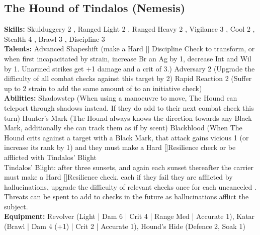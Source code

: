 \documentclass{article}
\newcommand\Hard{Hard [\Purple[3]]}
\begin{document}
\begin{multicols}{2}
{\subsection{The Hound of Tindalos (Nemesis)}
\begin{center}
\end{center}
\textbf{Skills:}
Skulduggery 2 \Yellow[2]\Green[2],
Ranged Light 2 \Yellow[2]\Green[3],
Ranged Heavy 2 \Yellow[2]\Green[3],
Vigilance 3 \Yellow[3],
Cool 2 \Yellow[2]\Green[1],
Stealth 4 \Yellow[4],
Brawl 3 \Yellow[3],
Discipline 3 \Yellow[3]
\\\textbf{Talents:}
Advanced Shapeshift (make a \Hard{} Discipline Check to transform, or when first incapacitated by strain, increase Br an Ag by 1, decrease Int and Wil by 1. Unarmed strikes get +1 damage and a crit of 3.)
Adversary 2 (Upgrade the difficulty of all combat checks against this target by 2)
Rapid Reaction 2 (Suffer up to 2 strain to add the same amount of \Success to an initiative check)
\\\textbf{Abilities:}
Shadowstep (When using a manoeuvre to move, The Hound can teleport through shadows instead. If they do add \Boost to their next combat check this turn)
Hunter's Mark (The Hound always knows the direction towards any Black Mark, additionally she can track them as if by scent)
Blackblood (When The Hound crits against a target with a Black Mark, that attack gains vicious 1 (or increase its rank by 1) and they must make a \Hard Resilience check or be afflicted with Tindalos' Blight
\\Tindalos' Blight: after three sunsets, and again each sunset thereafter the carrier must make a \Hard Resilience check. each if they fail they are afflicted by hallucinations, upgrade the difficulty of relevant checks once for each uncanceled \Fail. Threats can be spent to add \Black to checks in the future as hallucinations afflict the subject.
\\\textbf{Equipment:}
Revolver (Light | Dam 6 | Crit 4 | Range Med | Accurate 1), Katar (Brawl | Dam 4 (+1) | Crit 2 | Accurate 1), Hound's Hide (Defence 2, Soak 1)
}

\vbox{
}
\end{multicols}
\end{document}
